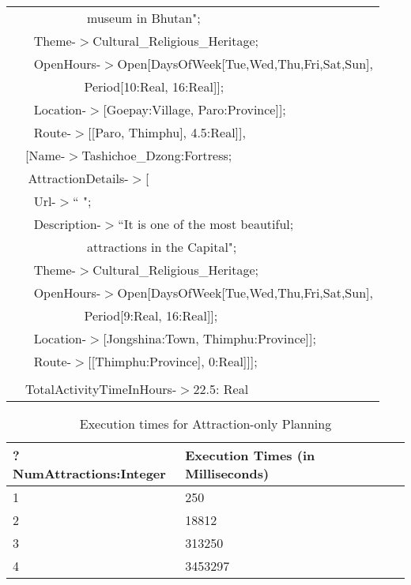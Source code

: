 \begin{table} [tbph]
\begin{tabular}{|l|l|}
			  &$~~~~~~~~~~~~~~~~~~~~~~$museum in Bhutan";\\
			  &$~~~$Theme-$>$Cultural\_Religious\_Heritage;\\
			  &$~~~$OpenHours-$>$Open[DaysOfWeek[Tue,Wed,Thu,Fri,Sat,Sun],\\
		  	&$~~~~~~~~~~~~~~~~~~~~~$Period[10:Real, 16:Real]];\\
			&$~~~$Location-$>$[Goepay:Village, Paro:Province]];\\
			&$~~~$Route-$>$[[Paro, Thimphu], 4.5:Real]],\\   
      &\cellcolor{yellow}[Name-$>$Tashichoe\_Dzong:Fortress;\\
  		 &$~$AttractionDetails-$>$[ \\
  		 &$~~~$Url-$>$`` ";	\\
		 &$~~~$Description-$>$``It is one of the most beautiful;\\
			  &$~~~~~~~~~~~~~~~~~~~~~~$attractions in the Capital";\\
			  &$~~~$Theme-$>$Cultural\_Religious\_Heritage;\\
			  &$~~~$OpenHours-$>$Open[DaysOfWeek[Tue,Wed,Thu,Fri,Sat,Sun],\\
		  	&$~~~~~~~~~~~~~~~~~~~~~$Period[9:Real, 16:Real]];\\
			&$~~~$Location-$>$[Jongshina:Town, Thimphu:Province]];\\
			&$~~~$Route-$>$[[Thimphu:Province], 0:Real]]];\\
		 &$~~~$	\\
	 &TotalActivityTimeInHours-$>$22.5: Real\\   
\hline		   
\end{tabular} 
\end{table} 

\begin{table} [tbph]
\caption{Execution times for Attraction-only Planning}
\centering
\footnotesize
\begin{tabular}{|l|l|}
\hline
  ?NumAttractions:Integer & Execution Times (in Milliseconds)\\
\hline
  1  & 250 \\
\hline
  2   &18812 \\
\hline
  3 & 313250\\
\hline
  4 & 3453297 \\
\hline
\end{tabular} 
\end{table} 

